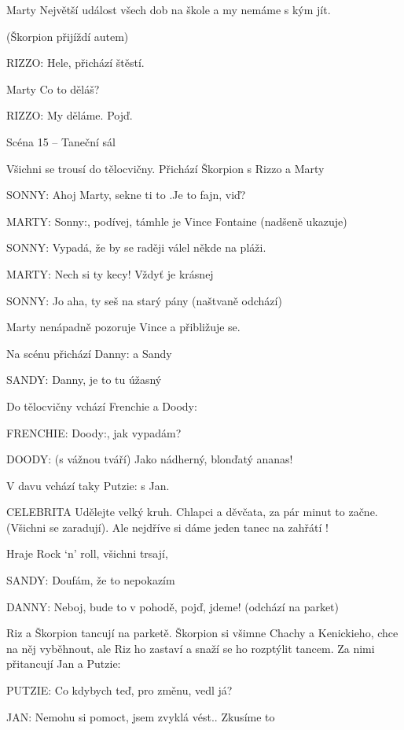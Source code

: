 Marty        Největší událost všech dob na škole a my nemáme s kým jít.

(Škorpion přijíždí autem)

\rep RIZZO:        Hele, přichází štěstí.

Marty        Co to děláš?

\rep RIZZO:        My děláme. Pojď.

Scéna 15 – Taneční sál 

Všichni se trousí do tělocvičny. Přichází Škorpion s Rizzo a Marty

\rep SONNY:        Ahoj Marty, sekne ti to .Je to fajn, viď? 

\rep MARTY:        \rep Sonny:, podívej, támhle je Vince Fontaine (nadšeně ukazuje) 

\rep SONNY:        Vypadá, že by se raději válel někde na pláži. 

\rep MARTY:        Nech si ty kecy! Vždyť je krásnej 

\rep SONNY:        Jo aha, ty seš na starý pány (naštvaně odchází) 

Marty nenápadně pozoruje Vince a přibližuje se. 

Na scénu přichází \rep Danny: a Sandy 

\rep SANDY:        Danny, je to tu úžasný

Do tělocvičny vchází Frenchie a \rep Doody:

\rep FRENCHIE:        \rep Doody:, jak vypadám? 

\rep DOODY:        (s vážnou tváří) Jako nádherný, blonďatý ananas! 

V davu vchází taky \rep Putzie: s Jan. 

CELEBRITA         Udělejte velký kruh. Chlapci a děvčata, za pár minut to začne.         (Všichni se zaradují). Ale nejdříve si dáme jeden tanec na zahřátí ! 

Hraje Rock ‘n’ roll, všichni trsají,

\rep SANDY:        Doufám, že to nepokazím 

\rep DANNY:        Neboj, bude to v pohodě, pojď, jdeme! (odchází na parket)

        Riz a Škorpion tancují na parketě. Škorpion si všimne Chachy a Kenickieho, chce na něj vyběhnout, ale Riz ho zastaví a snaží se ho rozptýlit tancem. Za nimi přitancují Jan a \rep Putzie:

\rep PUTZIE:        Co kdybych teď, pro změnu, vedl já?

\rep JAN:        Nemohu si pomoct, jsem zvyklá vést.. Zkusíme to


